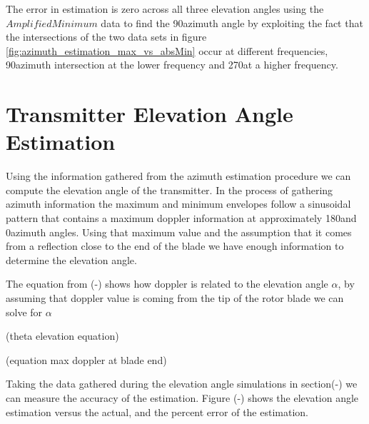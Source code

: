 The error in estimation is zero across all three elevation angles using the $AmplifiedMinimum$ data to find the 90\textdegree azimuth angle by exploiting the fact that the intersections of the two data sets in figure \ref{fig:azimuth_estimation_max_vs_absMin} occur at different frequencies, 90\textdegree \space azimuth intersection at the lower frequency and 270\textdegree \space at a higher frequency.


\section{Transmitter Elevation Angle Estimation}
Using the information gathered from the azimuth estimation procedure we can compute the elevation angle of the transmitter. In the process of gathering azimuth information the maximum and minimum envelopes follow a sinusoidal pattern that contains a maximum doppler information at approximately 180\textdegree \space and 0\textdegree \space azimuth angles. Using that maximum value and the assumption that it comes from a reflection close to the end of the blade we have enough information to determine the elevation angle. 

The equation from (-) shows how doppler is related to the elevation angle $\alpha$, by assuming that doppler value is coming from the tip of the rotor blade we can solve for $\alpha$

 (theta elevation equation)

(equation max doppler at blade end)

Taking the data gathered during the elevation angle simulations in section(-) we can measure the accuracy of the estimation. Figure (-) shows the elevation angle estimation versus the actual, and the percent error of the estimation.






